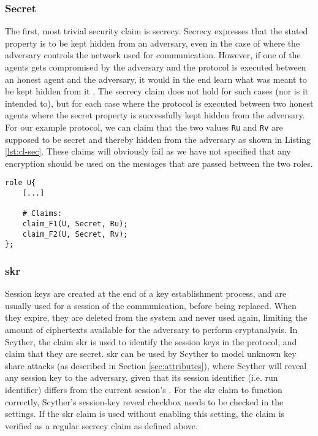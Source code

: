 \subsubsection{Secret}


The first, most trivial security claim is secrecy. Secrecy expresses that the stated property is to be kept hidden from an adversary, even in the case of where the adversary controls the network used for communication. However, if one of the agents gets compromised by the adversary and the protocol is executed between an honest agent and the adversary, it would in the end learn what was meant to be kept hidden from it \cite{cremers2005operational}. The secrecy claim does not hold for such cases (nor is it intended to), but for each case where the protocol is executed between two honest agents where the secret property is successfully kept hidden from the adversary. For our example protocol, we can claim that the two values \texttt{Ru} and \texttt{Rv} are supposed to be secret and thereby hidden from the adversary as shown in Listing \ref{lst:cl-sec}. These claims will obviously fail as we have not specified that any encryption should be used on the messages that are passed between the two roles.\newline

\newpage

\begin{lstlisting}[caption={Example of how to claim secrecy for terms in Scyther.}, label={lst:cl-sec}]
role U{
	[...]
	
	# Claims:
	claim_F1(U, Secret, Ru);
	claim_F2(U, Secret, Rv);
};
\end{lstlisting}




\subsubsection{\gls{skr}}

Session keys are created at the end of a key establishment process, and are usually used for a session of the communication, before being replaced. When they expire, they are deleted from the system and never used again, limiting the amount of ciphertexts available for the adversary to perform cryptanalysis. In Scyther, the claim \gls{skr} is used to identify the session keys in the protocol, and claim that they are secret. \gls{skr} can be used by Scyther to model unknown key share attacks (as described in Section \ref{sec:attributes}), where Scyther will reveal any session key to the adversary, given that its session identifier (i.e. run identifier) differs from the current session's \cite{cremers2014improving}. For the \gls{skr} claim to function correctly, Scyther's session-key reveal checkbox needs to be checked in the settings. If the \gls{skr} claim is used without enabling this setting, the claim is verified as a regular secrecy claim as defined above.


